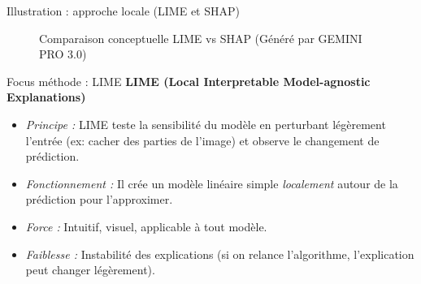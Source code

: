 \documentclass[9pt, aspectratio=169]{beamer}
\begin{document}
\begin{frame}{Illustration : approche locale (LIME et SHAP)}
    \begin{figure}
        \centering
        \caption{Comparaison conceptuelle LIME vs SHAP (Généré par GEMINI PRO 3.0)}
    \end{figure}
\end{frame}

\begin{frame}{Focus méthode : LIME}
    \textbf{LIME (Local Interpretable Model-agnostic Explanations)}
    \begin{itemize}
        \item \textit{Principe :} LIME teste la sensibilité du modèle en perturbant légèrement l'entrée (ex: cacher des parties de l'image) et observe le changement de prédiction.
        \item \textit{Fonctionnement :} Il crée un modèle linéaire simple \textit{localement} autour de la prédiction pour l'approximer.
        \item \textit{Force :} Intuitif, visuel, applicable à tout modèle.
        \item \textit{Faiblesse :} Instabilité des explications (si on relance l'algorithme, l'explication peut changer légèrement).
    \end{itemize}
\end{frame}
\end{document}
